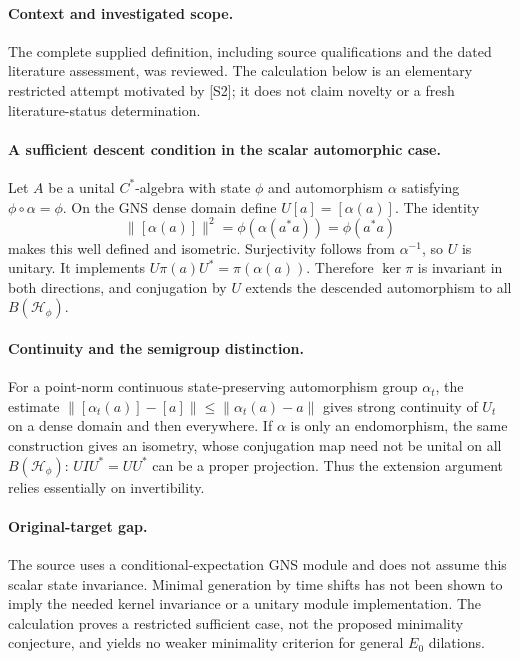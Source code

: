 \documentclass[11pt]{article}
\begin{document}
\paragraph{Context and investigated scope.} The complete supplied definition, including source qualifications and the dated literature assessment, was reviewed. The calculation below is an elementary restricted attempt motivated by [S2]; it does not claim novelty or a fresh literature-status determination.

\paragraph{A sufficient descent condition in the scalar automorphic case.} Let $A$ be a unital $C^*$-algebra with state $\phi$ and automorphism $\alpha$ satisfying $\phi\circ\alpha=\phi$. On the GNS dense domain define $U[a]=[\alpha(a)]$. The identity
\[
 \|[\alpha(a)]\|^2=\phi(\alpha(a^*a))=\phi(a^*a)
\]
makes this well defined and isometric. Surjectivity follows from $\alpha^{-1}$, so $U$ is unitary. It implements $U\pi(a)U^*=\pi(\alpha(a))$. Therefore $\ker\pi$ is invariant in both directions, and conjugation by $U$ extends the descended automorphism to all $B(\mathcal H_\phi)$.

\paragraph{Continuity and the semigroup distinction.} For a point-norm continuous state-preserving automorphism group $\alpha_t$, the estimate $\|[\alpha_t(a)]-[a]\|\leq\|\alpha_t(a)-a\|$ gives strong continuity of $U_t$ on a dense domain and then everywhere. If $\alpha$ is only an endomorphism, the same construction gives an isometry, whose conjugation map need not be unital on all $B(\mathcal H_\phi)$: $UIU^*=UU^*$ can be a proper projection. Thus the extension argument relies essentially on invertibility.

\paragraph{Original-target gap.} The source uses a conditional-expectation GNS module and does not assume this scalar state invariance. Minimal generation by time shifts has not been shown to imply the needed kernel invariance or a unitary module implementation. The calculation proves a restricted sufficient case, not the proposed minimality conjecture, and yields no weaker minimality criterion for general $E_0$ dilations.
\end{document}

